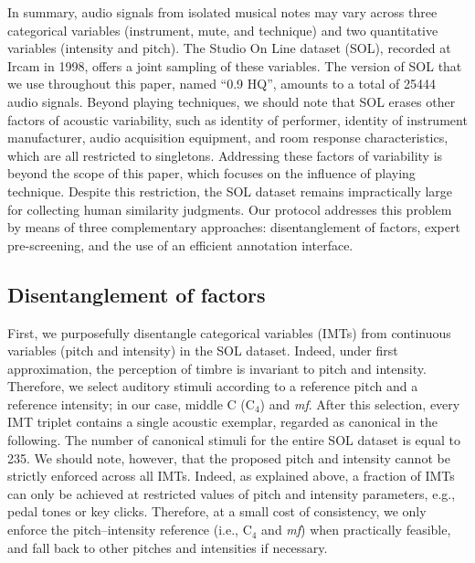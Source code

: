 \documentclass{bmcart}
\makeatletter
\newcommand*{\eg}{e.g.,\@\xspace}
\newcommand*{\ie}{i.e.,\@\xspace}
\makeatother
\begin{document}
In summary, audio signals from isolated musical notes may vary across three categorical variables (instrument, mute, and technique) and two quantitative variables (intensity and pitch).
The Studio On Line dataset (SOL), recorded at Ircam in 1998, offers a joint sampling of these variables.
The version of SOL that we use throughout this paper, named ``0.9 HQ'', amounts to a total of 25444 audio signals.
Beyond playing techniques, we should note that SOL erases other factors of acoustic variability, such as identity of performer, identity of instrument manufacturer, audio acquisition equipment, and room response characteristics, which are all restricted to singletons.
Addressing these factors of variability is beyond the scope of this paper, which focuses on the influence of playing technique.
Despite this restriction, the SOL dataset remains impractically large for collecting human similarity judgments.
Our protocol addresses this problem by means of three complementary approaches: disentanglement of factors, expert pre-screening, and the use of an efficient annotation interface.

\subsection*{Disentanglement of factors}
First, we purposefully disentangle categorical variables (IMTs) from continuous variables (pitch and intensity) in the SOL dataset.
Indeed, under first approximation, the perception of timbre is invariant to pitch and intensity.
Therefore, we select auditory stimuli according to a reference pitch and a reference intensity; in our case, middle C ($\mathrm{C_4}$) and \emph{mf}.
After this selection, every IMT triplet contains a single acoustic exemplar, regarded as canonical in the following.
The number of canonical stimuli for the entire SOL dataset is equal to 235.
We should note, however, that the proposed pitch and intensity cannot be strictly enforced across all IMTs.
Indeed, as explained above, a fraction of IMTs can only be achieved at restricted values of pitch and intensity parameters, \eg{} pedal tones or key clicks.
Therefore, at a small cost of consistency, we only enforce the pitch--intensity reference (\ie{} $\mathrm{C_4}$ and \emph{mf}) when practically feasible, and fall back to other pitches and intensities if necessary.
\end{document}
